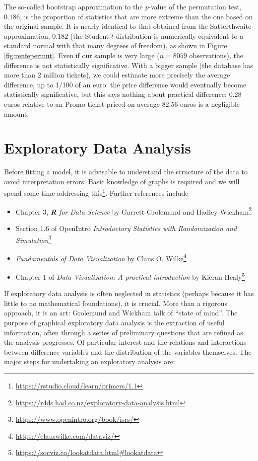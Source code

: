 \documentclass[
  11pt,
  letterpaper,
]{book}
\providecommand{\tightlist}{%
  \setlength{\itemsep}{0pt}\setlength{\parskip}{0pt}}
\renewcommand{\href}[2]{#2\footnote{\url{#1}}}
\theoremstyle{definition}
\theoremstyle{definition}
\theoremstyle{definition}
\theoremstyle{remark}
\begin{document}
The so-called bootstrap approximation to the \emph{p}-value of the permutation test, \(0.186\), is the proportion of statistics that are more extreme than the one based on the original sample. It is nearly identical to that obtained from the Satterthwaite approximation, \(0.182\) (the Student-\(t\) distribution is numerically equivalent to a standard normal with that many degrees of freedom), as shown in Figure \ref{fig:renfepermut}. Even if our sample is very large (\(n=8059\) observations), the difference is not statistically significative. With a bigger sample (the database has more than 2 million tickets), we could estimate more precisely the average difference, up to 1/100 of an euro: the price difference would eventually become statistically significative, but this says nothing about practical difference: \(0.28\) euros relative to an Promo ticket priced on average \(82.56\) euros is a negligible amount.

\hypertarget{eda}{%
\section{Exploratory Data Analysis}\label{eda}}

Before fitting a model, it is advisable to understand the structure of the data to avoid interpretation errors. Basic knowledge of graphs is required and we will spend some time \href{https://rstudio.cloud/learn/primers/1.1}{addressing this}. Further references include

\begin{itemize}
\tightlist
\item
  \href{https://r4ds.had.co.nz/exploratory-data-analysis.html}{Chapter 3, \emph{\textbf{R} for Data Science} by Garrett Grolemund and Hadley Wickham}
\item
  \href{https://www.openintro.org/book/isrs/}{Section 1.6 of OpenIntro \emph{Introductory Statistics with Randomization and Simulation}}
\item
  \href{https://clauswilke.com/dataviz/}{\emph{Fundamentals of Data Visualization} by Claus O. Wilke}
\item
  \href{https://socviz.co/lookatdata.html\#lookatdata}{Chapter 1 of \emph{Data Visualization: A practical introduction} by Kieran Healy}
\end{itemize}

If exploratory data analysis is often neglected in statistics (perhaps because it has little to no mathematical foundations), it is crucial. More than a rigorous approach, it is an art: Grolemund and Wickham talk of ``state of mind''. The purpose of graphical exploratory data analysis is the extraction of useful information, often through a series of preliminary questions that are refined as the analysis progresses. Of particular interest and the relations and interactions between difference variables and the distribution of the variables themselves. The major steps for undertaking an exploratory analysis are:
\end{document}
